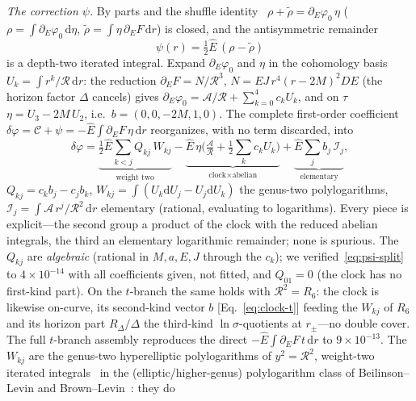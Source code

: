 \documentclass[
    aps, prd, twocolumn, superscriptaddress,
    showpacs, nofootinbib, floatfix
]{revtex4-2}
\newcommand{\Ehat}{\hat E}
\newcommand{\dd}{\mathrm{d}}
\begin{document}
\emph{The correction $\psi$.} By parts and the shuffle identity~\cite{Chen1977}
$\rho+\tilde\rho=\partial_E\varphi_0\,\eta$
($\rho=\int\partial_E\varphi_0\,\dd\eta$,
$\tilde\rho=\int\eta\,\partial_E F\,\dd r$) is closed, and the antisymmetric
remainder
\begin{equation}
    \psi(r)=\tfrac12\Ehat\,(\rho-\tilde\rho)
    \label{eq:psi-irr}
\end{equation}
is a depth-two iterated integral. Expand $\partial_E\varphi_0$ and $\eta$ in the
cohomology basis $U_k=\int r^k/\mathcal{R}\,\dd r$: the reduction
$\partial_E F=N/\mathcal{R}^3$, $N=EJ\,r^4(r-2M)^2 DE$ (the horizon factor $\Delta$
cancels) gives $\partial_E\varphi_0=\mathcal{A}/\mathcal{R}+\sum_{k=0}^4 c_k U_k$,
and on $\tau$ $\eta=U_3-2M\,U_2$, i.e.\ $b=(0,0,-2M,1,0)$. The complete first-order
coefficient $\delta\varphi=\mathcal{C}+\psi=-\Ehat\int\partial_E F\,\eta\,\dd r$
reorganizes, with no term discarded, into
\begin{equation}
    \delta\varphi=
    \underbrace{\tfrac12\Ehat\!\sum_{k<j}Q_{kj}\,W_{kj}}_{\text{weight two}}
    -\underbrace{\Ehat\,\eta\big(\tfrac{\mathcal{A}}{\mathcal{R}}
    +\tfrac12\!\sum_k c_k U_k\big)}_{\text{clock}\times\text{abelian}}
    +\underbrace{\Ehat\!\sum_j b_j\,\mathcal{I}_j}_{\text{elementary}},
    \label{eq:psi-split}
\end{equation}
$Q_{kj}=c_k b_j-c_j b_k$, $W_{kj}=\int(U_k\dd U_j-U_j\dd U_k)$ the genus-two
polylogarithms, $\mathcal{I}_j=\int\mathcal{A}\,r^j/\mathcal{R}^2\,\dd r$ elementary
(rational, evaluating to logarithms). Every piece is explicit---the second group a
product of the clock with the reduced abelian integrals, the third an elementary
logarithmic remainder; none is spurious. The $Q_{kj}$ are \emph{algebraic}
(rational in $M,a,E,J$ through the $c_k$); we verified~\eqref{eq:psi-split} to
$4\times10^{-14}$ with all coefficients given, not fitted, and $Q_{01}=0$ (the clock
has no first-kind part). On the $t$-branch the same holds with
$\mathcal{R}^2=R_6$: the clock is likewise on-curve, its second-kind vector $b$
[Eq.~\eqref{eq:clock-t}] feeding the $W_{kj}$ of $R_6$ and its horizon part
$R_\Delta/\Delta$ the third-kind $\ln\sigma$-quotients at $r_\pm$---no double cover.
The full $t$-branch assembly reproduces the direct
$-\Ehat\!\int\!\partial_E F\,t\,\dd r$ to $9\times10^{-13}$.
The $W_{kj}$ are the genus-two hyperelliptic
polylogarithms of $y^2=\mathcal{R}^2$, weight-two iterated
integrals~\cite{Chen1977} in the (elliptic/higher-genus) polylogarithm class of
Beilinson--Levin and Brown--Levin~\cite{BeilinsonLevin1994,BrownLevin2011}: they do
\end{document}
